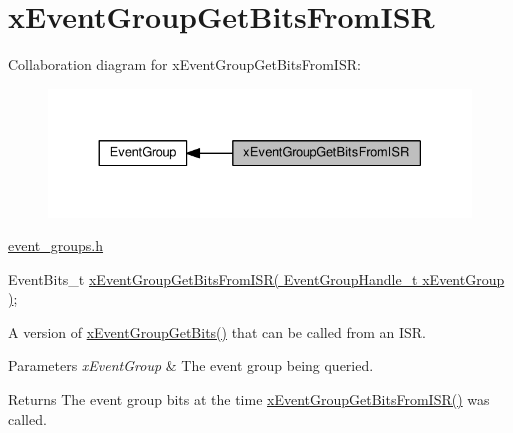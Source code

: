 \hypertarget{group__x_event_group_get_bits_from_i_s_r}{}\section{x\+Event\+Group\+Get\+Bits\+From\+I\+SR}
\label{group__x_event_group_get_bits_from_i_s_r}
Collaboration diagram for x\+Event\+Group\+Get\+Bits\+From\+I\+SR\+:\nopagebreak
\begin{figure}[H]
\begin{center}
\leavevmode
\includegraphics[width=330pt]{group__x_event_group_get_bits_from_i_s_r}
\end{center}
\end{figure}
\hyperlink{event__groups_8h}{event\+\_\+groups.\+h} 
\begin{DoxyPre}
   EventBits\_t \hyperlink{event__groups_8h_a95822db4357d0b77c35aed0c7427eca0}{xEventGroupGetBitsFromISR( EventGroupHandle\_t xEventGroup )};
\end{DoxyPre}


A version of \hyperlink{event__groups_8h_a0ae86f092fb07ccb475ae938f9a12584}{x\+Event\+Group\+Get\+Bits()} that can be called from an I\+SR.


\begin{DoxyParams}{Parameters}
{\em x\+Event\+Group} & The event group being queried.\\
\hline
\end{DoxyParams}
\begin{DoxyReturn}{Returns}
The event group bits at the time \hyperlink{event__groups_8h_a95822db4357d0b77c35aed0c7427eca0}{x\+Event\+Group\+Get\+Bits\+From\+I\+S\+R()} was called. 
\end{DoxyReturn}
